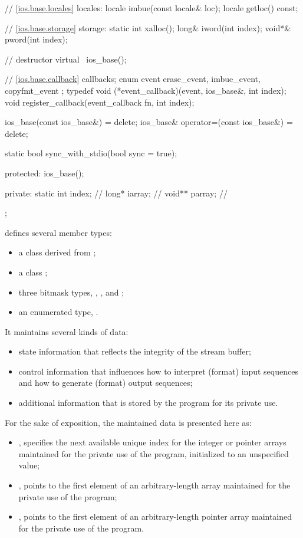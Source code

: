 \begin{codeblock}
{{    // \ref{ios.base.locales} locales:
    locale imbue(const locale& loc);
    locale getloc() const;

    // \ref{ios.base.storage} storage:
    static int xalloc();
    long&  iword(int index);
    void*& pword(int index);

    // destructor
    virtual ~ios_base();

    // \ref{ios.base.callback} callbacks;
    enum event { erase_event, imbue_event, copyfmt_event };
    typedef void (*event_callback)(event, ios_base&, int index);
    void register_callback(event_callback fn, int index);

    ios_base(const ios_base&) = delete;
    ios_base& operator=(const ios_base&) = delete;

    static bool sync_with_stdio(bool sync = true);

  protected:
    ios_base();

  private:
    static int index;  // \exposr
    long* iarray;      // \exposr
    void** parray;     // \exposr
  };
}
\end{codeblock}

\pnum
{}
defines several member types:
\begin{itemize}
\item a class  derived from ;

\item a class ;

\item three bitmask types, , , and ;

\item an enumerated type, .
\end{itemize}

\pnum
It maintains several kinds of data:
\begin{itemize}
\item
state information that reflects the integrity of the stream buffer;
\item
control information that influences how to interpret (format) input
sequences and how to generate (format) output sequences;
\item
additional information that is stored by the program for its private use.
\end{itemize}

\pnum
\enternote
For the sake of exposition, the maintained data is presented here as:
\begin{itemize}
\item
{},
specifies the next available
unique index for the integer or pointer arrays maintained for the private use
of the program, initialized to an unspecified value;
\item
{},
points to the first element of an
arbitrary-length
array maintained for the private use of the
program;
\item
{},
points to the first element of an
arbitrary-length pointer array maintained for the private use of the program.
\exitnote
\end{itemize}

